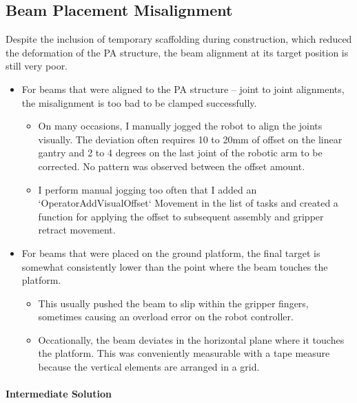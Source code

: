 \subsection{Beam Placement Misalignment}
\label{subsection:exploration-3-beam-placement-misalignment}

Despite the inclusion of temporary scaffolding during construction, which reduced the deformation of the PA structure, the beam alignment at its target position is still very poor.

\begin{itemize}
	\item For beams that were aligned to the PA structure -- joint to joint alignments, the misalignment is too bad to be clamped successfully. 

    \begin{itemize}
        \item On many occasions, I manually jogged the robot to align the joints visually. The deviation often requires 10 to 20mm of offset on the linear gantry and 2 to 4 degrees on the last joint of the robotic arm to be corrected. No pattern was observed between the offset amount.

        \item I perform manual jogging too often that I added an `OperatorAddVisualOffset` Movement in the list of tasks and created a function for applying the offset to subsequent assembly and gripper retract movement. 

    \end{itemize}

	\item For beams that were placed on the ground platform, the final target is somewhat consistently lower than the point where the beam touches the platform. 
    \begin{itemize}
        \item This usually pushed the beam to slip within the gripper fingers, sometimes causing an overload error on the robot controller.

        \item Occationally, the beam deviates in the horizontal plane where it touches the platform. This was conveniently measurable with a tape measure because the vertical elements are arranged in a grid.
    \end{itemize}
\end{itemize}

\paragraph{Intermediate Solution}

